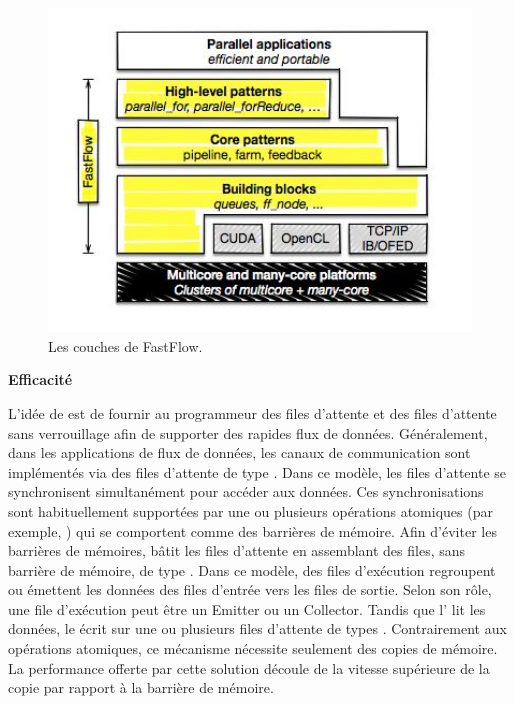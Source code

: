 \begin{figure}[ht]
\centering
     \includegraphics[width=1.0\textwidth]{Figures/FastFlowLayers.jpg}
      \caption{Les couches de FastFlow.}
       \label{FastFlowLayers.fig}
\end{figure}

\textbf{Efficacit\'e}

L'id\'ee de  est de fournir au programmeur des files d'attente  et des files d'attente  sans verrouillage afin de supporter des rapides flux de donn\'ees. G\'en\'eralement, dans les applications de flux de donn\'ees, les canaux de communication sont impl\'ementés via des files d'attente de type . Dans ce modèle, les files d'attente se synchronisent simultanément pour acc\'eder aux donn\'ees. Ces synchronisations sont habituellement support\'ees par une ou plusieurs op\'erations atomiques (par exemple, ) qui se comportent comme des barri\`eres de m\'emoire. Afin d'\'eviter les barri\`eres de m\'emoires,  b\^atit les files d'attente  en assemblant des files, sans barri\`ere de m\'emoire, de type . Dans ce mod\`ele, des files d’ex\'ecution regroupent ou \'emettent les donn\'ees des files d'entr\'ee vers les files de sortie. Selon son r\^ole, une file d'ex\'ecution peut \^etre un Emitter ou un Collector. Tandis que l' lit les donn\'ees, le  \'ecrit sur une ou plusieurs files d'attente de types . Contrairement aux op\'erations atomiques, ce m\'ecanisme n\'ecessite seulement des copies de m\'emoire. La performance offerte par cette solution d\'ecoule de la vitesse sup\'erieure de la copie par rapport \`a la barri\`ere de m\'emoire.


